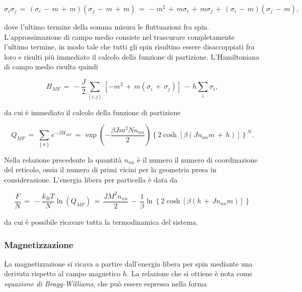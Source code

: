 \begin{equation}
    \sigma_i \sigma_j\,=\,\left(\sigma_i\,-\,m\,+\,m\right)\left(\sigma_j\,-\,m\,+\,m\right)\,=\,-m^2\,+\,m\sigma_i\,+\,m\sigma_j\,+\,\left(\sigma_i\,-\,m\right)\left(\sigma_j\,-\,m\right),
    \label{eq: int_mf}
\end{equation}

dove l'ultimo termine della somma misura le fluttuazioni fra spin. L'approssimazione di campo medio consiste nel trascurare 
completamente l'ultimo termine, in modo tale che tutti gli spin risultino essere disaccoppiati fra loro e risulti più immediato il 
calcolo della funzione di partizione. L'Hamiltoniana di campo medio risulta quindi 

\begin{equation}
    H_{MF}\,=\,-\frac{J}{2} \sum_{\left<i,j\right>} \left[-m^2\,+\,m\left(\sigma_i\,+\,\sigma_j\right)\right]\,-\,h\sum_{i}\sigma_i,
    \label{eq: ham_mf}
\end{equation}

da cui è immediato il calcolo della funzione di partizione 

\begin{equation}
    Q_{MF}\,=\,\sum_{\left\{\sigma\right\}} e^{-\beta H_{MF}}\,=\,\exp{\left(-\frac{\beta J m^2 N n_{nn}}{2}\right)} \left\{2 \cosh{\left[\beta \left(J n_{nn} m\,+\,h\right)\right]}\right\}^N.
    \label{eq: part_MF_Ising1D}
\end{equation}

Nella relazione precedente la quantità $n_{nn}$ è il numero il numero di coordinazione del reticolo, ossia il numero di primi vicini per la 
geometria presa in considerazione. L'energia libera per particella è data da 

\begin{equation}
    \frac{F}{N}\,=\,-\frac{k_B T}{N} \ln{\left(Q_{MF}\right)}\,=\,\frac{JM^2n_{nn}}{2}\,-\,\frac{1}{\beta}\ln{\left\{2 \cosh{\left[\beta\left(h\,+\,Jn_{nn}m\right)\right]}\right\}}
    \label{eq: freeE_MF_Ising1D}
\end{equation}

da cui è possibile ricavare tutta la termodinamica del sistema.



\subsubsection{Magnetizzazione}

La magnetizzazione si ricava a partire dall'energia libera per spin mediante una derivata rispetto al campo magnetico $h$. 
La relazione che si ottiene è nota come \textit{equazione di Bragg-Williams}, che può essere espressa nella forma 

